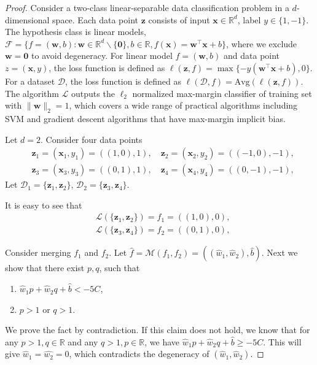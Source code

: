 \thmb*


\begin{proof}
    Consider a two-class linear-separable data classification problem in a $d$-dimensional space. Each data point $\boldsymbol{z}$ consists of input $\boldsymbol{x}\in\mathbb{R}^d$, label $y\in \{1, -1\}$. The hypothesis class is linear models, $\mathcal{F} = \{f=(\boldsymbol{w}, b): \boldsymbol{w}\in\mathbb{R}^d\backslash\{\mathbf{0}\}, b \in \mathbb{R}, f(\boldsymbol{x}) = \boldsymbol{w}^\top \boldsymbol{x} + b\}$, where we exclude $\boldsymbol{w} = \mathbf{0}$ to avoid degeneracy.
    For linear model $f=(\boldsymbol{w}, b)$ and data point $z=(\boldsymbol{x},y)$, the loss function is defined as $\ell(\boldsymbol{z}, f) = \max\{-y(\boldsymbol{w}^\top \boldsymbol{x}+b), 0\}$. For a dataset $\mathcal{D}$, the loss function is defined as $\ell(\mathcal{D}, f) = \text{Avg}(\ell(\boldsymbol{z}, f))$.
    The algorithm $\mathcal{L}$ outputs the $\ell_2$ normalized max-margin classifier of training set with $\|\boldsymbol{w}\|_2 = 1$, which covers a wide range of practical algorithms including SVM and gradient descent algorithms that have max-margin implicit bias. 

    Let $d=2$. Consider four data points 
    \begin{align*}
        &\boldsymbol{z}_1 = (\boldsymbol{x}_1, y_1) = ((1, 0), 1),\quad \boldsymbol{z}_2 = (\boldsymbol{x}_2, y_2) = ((-1, 0), -1),\\
        &\boldsymbol{z}_3 = (\boldsymbol{x}_3, y_3) = ((0, 1), 1),\quad \boldsymbol{z}_4 = (\boldsymbol{x}_4, y_4) = ((0, -1), -1),
    \end{align*}
    Let $\mathcal{D}_1 = \{\boldsymbol{z}_1, \boldsymbol{z}_2\}$, $\mathcal{D}_2 = \{\boldsymbol{z}_3, \boldsymbol{z}_4\}$.

    It is easy to see that 
    \begin{align*}
        &\mathcal{L}(\{\boldsymbol{z}_1, \boldsymbol{z}_2\}) = f_1 = ((1, 0), 0),\\
        &\mathcal{L}(\{\boldsymbol{z}_3, \boldsymbol{z}_4\}) = f_2 = ((0, 1), 0),
    \end{align*}

    Consider merging $f_1$ and $f_2$.
    Let $\hat{f} = \mathcal{M}(f_1, f_2) = ((\hat{w}_1, \hat{w}_2), \hat{b})$. Next we show that there exist $p, q$, such that 

    \begin{enumerate}
    \setlength{\itemsep}{0pt} %
    \item $\hat{w}_1 p + \hat{w}_2 q + \hat{b} < -5C$,
    \item $p>1$ or $q>1$.
    \end{enumerate}
    We prove the fact by contradiction. If this claim does not hold, we know that for any $p>1, q\in\mathbb{R}$ and any $q>1, p\in\mathbb{R}$,  we have $\hat{w}_1 p + \hat{w}_2 q + \hat{b} \ge -5C$. This will give $\hat{w}_1 = \hat{w_2} = 0$, which contradicts the degeneracy of $(\hat{w}_1, \hat{w}_2)$.


\end{proof}
